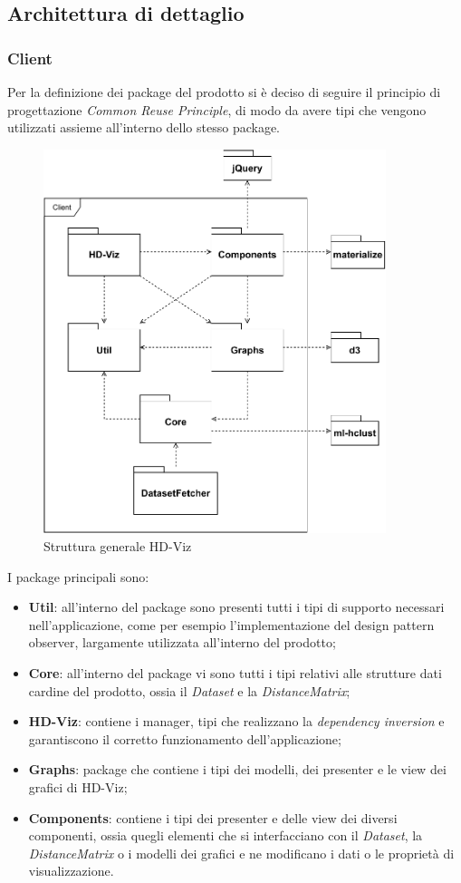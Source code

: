 \documentclass[../manuale_sviluppatore.tex]{subfiles}
\begin{document}
\subsection{Architettura di dettaglio}
\subsubsection{Client}
\label{ssub:client}

Per la definizione dei package del prodotto si è deciso di seguire il principio di progettazione 
\emph{Common Reuse Principle}, di modo da avere tipi che vengono utilizzati assieme all'interno 
dello stesso package.

\begin{figure}[H]
	\centering
	\includegraphics[width=10cm]{src/img/packageDiagramOverview.pdf}
	\caption{Struttura generale HD-Viz}
\end{figure}

I package principali sono:
\begin{itemize}
	\item \textbf{Util}: all'interno del package sono presenti tutti i tipi di supporto necessari 
	nell'applicazione, come per esempio l'implementazione del design pattern observer, largamente 
	utilizzata all'interno del prodotto;
	\item \textbf{Core}: all'interno del package vi sono tutti i tipi relativi alle strutture dati 
	cardine del prodotto, ossia il \emph{Dataset} e la \emph{DistanceMatrix};
	\item \textbf{HD-Viz}: contiene i manager, tipi che realizzano la \emph{dependency inversion} e 
	garantiscono il corretto funzionamento dell'applicazione;
	\item \textbf{Graphs}: package che contiene i tipi dei modelli, dei presenter e le view dei 
	grafici di HD-Viz;
	\item \textbf{Components}: contiene i tipi dei presenter e delle view dei diversi componenti, 
	ossia quegli elementi che si interfacciano con il \emph{Dataset}, la \emph{DistanceMatrix} o i 
	modelli dei grafici e ne modificano i dati o le proprietà di visualizzazione.
\end{itemize}
\end{document}
